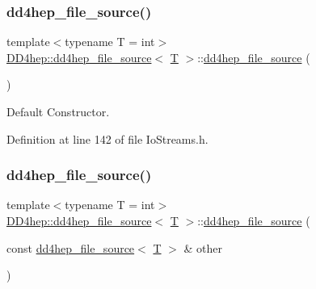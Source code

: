 \subsubsection{\texorpdfstring{dd4hep\+\_\+file\+\_\+source()}{dd4hep\_file\_source()}\hspace{0.1cm}{\footnotesize\ttfamily [1/4]}}
{\footnotesize\ttfamily template$<$typename T = int$>$ \\
\hyperlink{class_d_d4hep_1_1dd4hep__file__source}{D\+D4hep\+::dd4hep\+\_\+file\+\_\+source}$<$ \hyperlink{class_t}{T} $>$\+::\hyperlink{class_d_d4hep_1_1dd4hep__file__source}{dd4hep\+\_\+file\+\_\+source} (\begin{DoxyParamCaption}{ }\end{DoxyParamCaption})\hspace{0.3cm}{\ttfamily [inline]}}



Default Constructor. 



Definition at line 142 of file Io\+Streams.\+h.

\hypertarget{class_d_d4hep_1_1dd4hep__file__source_a0f0b058ced88e3e25a3f5ec615ce234b}{}\label{class_d_d4hep_1_1dd4hep__file__source_a0f0b058ced88e3e25a3f5ec615ce234b} 
\subsubsection{\texorpdfstring{dd4hep\+\_\+file\+\_\+source()}{dd4hep\_file\_source()}\hspace{0.1cm}{\footnotesize\ttfamily [2/4]}}
{\footnotesize\ttfamily template$<$typename T = int$>$ \\
\hyperlink{class_d_d4hep_1_1dd4hep__file__source}{D\+D4hep\+::dd4hep\+\_\+file\+\_\+source}$<$ \hyperlink{class_t}{T} $>$\+::\hyperlink{class_d_d4hep_1_1dd4hep__file__source}{dd4hep\+\_\+file\+\_\+source} (\begin{DoxyParamCaption}\item[{const \hyperlink{class_d_d4hep_1_1dd4hep__file__source}{dd4hep\+\_\+file\+\_\+source}$<$ \hyperlink{class_t}{T} $>$ \&}]{other }\end{DoxyParamCaption})\hspace{0.3cm}{\ttfamily [inline]}}



